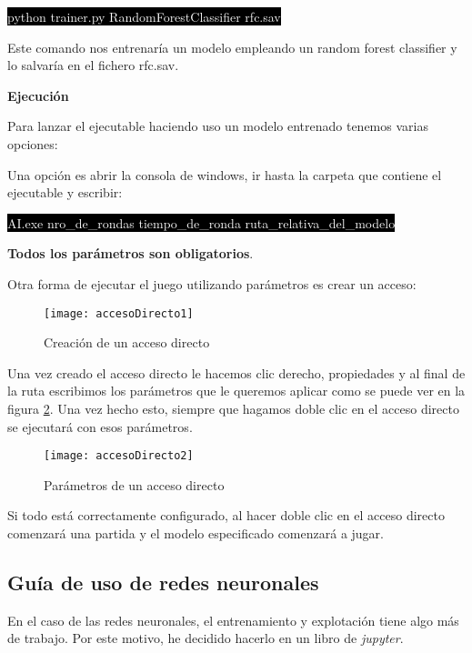 \colorbox{black}{\textcolor{white}{python trainer.py RandomForestClassifier rfc.sav}}

Este comando nos entrenaría un modelo empleando un random forest classifier y lo salvaría en el fichero rfc.sav.

\textbf{Ejecución}

Para lanzar el ejecutable haciendo uso un modelo entrenado tenemos varias opciones:

Una opción es abrir la consola de windows, ir hasta la carpeta que contiene el ejecutable y escribir:

\colorbox{black}{\textcolor{white}{AI.exe nro\_de\_rondas tiempo\_de\_ronda ruta\_relativa\_del\_modelo}}

\textbf{Todos los parámetros son obligatorios}.

Otra forma de ejecutar el juego utilizando parámetros es crear un acceso:

\begin{figure}[h!]
    \centering
    \texttt{[image: accesoDirecto1]}
    \caption{Creación de un acceso directo}
    \label{fig:accesoDirecto1}
\end{figure}


Una vez creado el acceso directo le hacemos clic derecho, propiedades y al final de la ruta escribimos los parámetros que le queremos aplicar como se puede ver en la figura \ref{fig:accesoDirecto2}. Una vez hecho esto, siempre que hagamos doble clic en el acceso directo se ejecutará con esos parámetros.


\begin{figure}[h!]
    \centering
    \texttt{[image: accesoDirecto2]}
    \caption{Parámetros de un acceso directo}
    \label{fig:accesoDirecto2}
\end{figure}

Si todo está correctamente configurado, al hacer doble clic en el acceso directo comenzará una partida y el modelo especificado comenzará a jugar.


\subsection{Guía de uso de redes neuronales}

En el caso de las redes neuronales, el entrenamiento y explotación tiene algo más de trabajo. Por este motivo, he decidido hacerlo en un libro de \emph{jupyter}.

